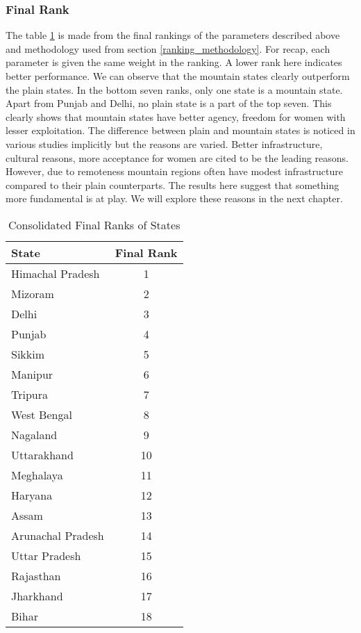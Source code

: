 \subsubsection{Final Rank}
 The table \ref{tab:consolidated_ranks} is made from the final rankings of the parameters described above and methodology used from section \ref{ranking_methodology}. For recap, each parameter is given the same weight in the ranking. A lower rank here indicates better performance. We can observe that the mountain states clearly outperform the plain states. In the bottom seven ranks, only one state is a mountain state. Apart from Punjab and Delhi, no plain state is a part of the top seven. This clearly shows that mountain states have better agency, freedom for women with lesser exploitation. The difference between plain and mountain states is noticed in various studies implicitly \citep{kishor2004women} but the reasons are varied. Better infrastructure, cultural reasons, more acceptance for women are cited to be the leading reasons. However, due to remoteness mountain regions often have modest infrastructure compared to their plain counterparts. The results here suggest that something more fundamental is at play. We will explore these reasons in the next chapter.
\begin{table}[h!]
\centering
\begin{tabular}{|l|c|}
\hline
\textbf{State} & \textbf{Final Rank} \\
\hline
Himachal Pradesh & 1 \\
Mizoram & 2 \\
Delhi & 3 \\
Punjab & 4 \\
Sikkim & 5 \\
Manipur & 6 \\
Tripura & 7 \\
West Bengal & 8 \\
Nagaland & 9 \\
Uttarakhand & 10 \\
Meghalaya & 11 \\
Haryana & 12 \\
Assam & 13 \\
Arunachal Pradesh & 14 \\
Uttar Pradesh & 15 \\
Rajasthan & 16 \\
Jharkhand & 17 \\
Bihar & 18 \\
\hline
\end{tabular}
\caption{Consolidated Final Ranks of States}
\label{tab:consolidated_ranks}
\end{table}
